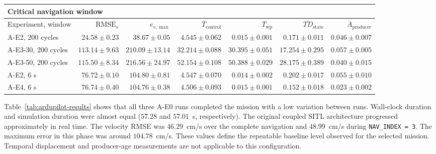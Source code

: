 \begin{table}[t]
    \vspace{1.2ex}

    \begin{tabular}{@{}lrrrrrr@{}}
        \toprule
        \multicolumn{7}{l}{
        \textbf{Critical navigation window}
        }\\
        \midrule
        Experiment, window &
        \(\mathrm{RMSE}_{v}\) &
        \(e_{v,\max}\) &
        \(\overline{T}_{\mathrm{control}}\) &
        \(\overline{T}_{\mathrm{wp}}\) &
        \(\overline{TD}_{\mathrm{state}}\) &
        \(\overline{A}_{\mathrm{producer}}\) \\
        \midrule

        A-E2, 200 cycles &
        \(24.58 \pm 0.23\) &
        \(38.67 \pm 0.05\) &
        \(4.545 \pm 0.062\) &
        \(0.015 \pm 0.001\) &
        \(0.171 \pm 0.011\) &
        \(0.046 \pm 0.007\) \\

        A-E3-30, 200 cycles &
        \(113.14 \pm 9.63\) &
        \(210.09 \pm 13.14\) &
        \(32.214 \pm 0.088\) &
        \(30.395 \pm 0.051\) &
        \(17.254 \pm 0.295\) &
        \(0.057 \pm 0.005\) \\

        A-E3-50, 200 cycles &
        \(115.50 \pm 8.34\) &
        \(216.56 \pm 24.97\) &
        \(52.154 \pm 0.108\) &
        \(50.388 \pm 0.029\) &
        \(28.175 \pm 0.389\) &
        \(0.040 \pm 0.015\) \\

        A-E2, 6 s &
        \(76.72 \pm 0.10\) &
        \(104.80 \pm 0.81\) &
        \(4.547 \pm 0.070\) &
        \(0.014 \pm 0.002\) &
        \(0.202 \pm 0.017\) &
        \(0.055 \pm 0.010\) \\

        A-E4, 6 s &
        \(76.74 \pm 0.40\) &
        \(104.76 \pm 0.38\) &
        \(4.506 \pm 0.093\) &
        \(0.015 \pm 0.001\) &
        \(0.152 \pm 0.018\) &
        \(0.023 \pm 0.002\) \\

        \bottomrule
    \end{tabular}
\end{table}

\noindent Table~\ref{tab:ardupilot-results} shows that all three A-E0 runs completed the mission with a low variation between runs. Wall-clock duration and simulation duration were almost equal
(\(57.28\) and \(57.01\)~s, respectively). The original coupled SITL architecture progressed approximately in real time. The velocity RMSE was \(46.29\)~cm/s over the complete navigation and \(48.99\)~cm/s during \texttt{NAV\_INDEX = 3}. The maximum error in this phase was around \(104.78\)~cm/s. These values define the repeatable baseline level observed for the selected mission. Temporal displacement and producer-age measurements are not applicable to this configuration.

